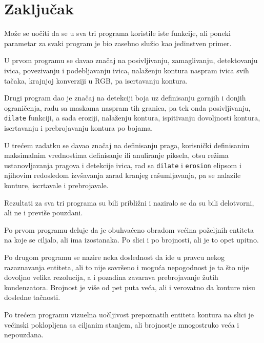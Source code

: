 \documentclass[fontsize=12bp, paper=a4]{scrarticle}
\begin{document}
\section{Zaključak}
Može se uočiti da se u sva tri programa koristile iste funkcije, ali poneki parametar za svaki program je bio zasebno služio kao jedinstven primer. 

U prvom programu se davao značaj na posivljivanju, zamaglivanju, detektovanju ivica, povezivanju i podebljavanju ivica, nalaženju kontura naspram ivica svih tačaka, krajnjoj konverziji u RGB, pa iscrtavanju kontura. 

Drugi program dao je značaj na detekciji boja uz definisanju gornjih i donjih ograničenja, radu sa maskama naspram tih granica, pa tek onda posivljivanju, \verb|dilate| funkciji, a sada eroziji, nalaženju kontura, ispitivanju dovoljnosti kontura, iscrtavanju i prebrojavanju kontura po bojama.

U trećem zadatku se davao značaj na definisanju praga, korisnički definisanim maksimalnim vrednostima definisanje ili anuliranje piksela, otsu režima ustanovljavanja pragova i detekcije ivica, rad sa \verb|dilate| i \verb|erosion| elipsom i njihovim redosledom izvšavanja zarad kranjeg rašumljavanja, pa se nalazile konture, iscrtavale i prebrojavale. 

Rezultati za sva tri programa su bili približni i naziralo se da su bili delotvorni, ali ne i previše pouzdani.

Po prvom programu deluje da je obuhvaćeno obradom većina poželjnih entiteta na koje se ciljalo, ali ima izostanaka. Po slici i po brojnosti, ali je to opet upitno.

Po drugom programu se nazire neka doslednost da ide u pravcu nekog razaznavanja entiteta, ali to nije savršeno i moguća nepogodnost je ta što nije dovoljno velika rezolucija, a i pozadina zavarava prebrojavanje žutih kondenzatora. Brojnost je više od pet puta veća, ali i verovatno da konture nisu dosledne tačnosti.

Po trećem programu vizuelna uočljivost prepoznatih entiteta kontura na slici je većinski poklopljena sa ciljanim stanjem, ali brojnostje mnogostruko veća i nepouzdana.
\end{document}

